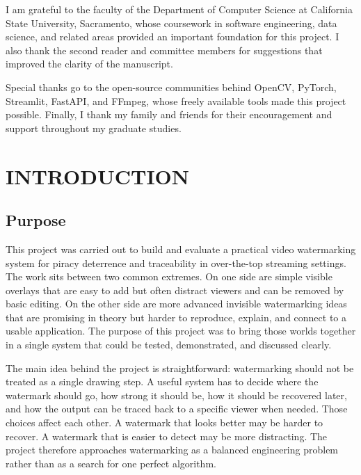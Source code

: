 \documentclass[12pt,oneside]{report}
\begin{document}
I am grateful to the faculty of the Department of Computer Science at California State University, Sacramento, whose coursework in software engineering, data science, and related areas provided an important foundation for this project. I also thank the second reader and committee members for suggestions that improved the clarity of the manuscript.

Special thanks go to the open-source communities behind OpenCV, PyTorch, Streamlit, FastAPI, and FFmpeg, whose freely available tools made this project possible. Finally, I thank my family and friends for their encouragement and support throughout my graduate studies.

\clearpage
\begingroup
\singlespacing
\tableofcontents
\endgroup
\clearpage
\begingroup
\singlespacing
\listoffigures
\endgroup

\clearpage
\chapter{INTRODUCTION}
\section{Purpose}
This project was carried out to build and evaluate a practical video watermarking system for piracy deterrence and traceability in over-the-top streaming settings. The work sits between two common extremes. On one side are simple visible overlays that are easy to add but often distract viewers and can be removed by basic editing. On the other side are more advanced invisible watermarking ideas that are promising in theory but harder to reproduce, explain, and connect to a usable application. The purpose of this project was to bring those worlds together in a single system that could be tested, demonstrated, and discussed clearly.

The main idea behind the project is straightforward: watermarking should not be treated as a single drawing step. A useful system has to decide where the watermark should go, how strong it should be, how it should be recovered later, and how the output can be traced back to a specific viewer when needed. Those choices affect each other. A watermark that looks better may be harder to recover. A watermark that is easier to detect may be more distracting. The project therefore approaches watermarking as a balanced engineering problem rather than as a search for one perfect algorithm.
\end{document}
